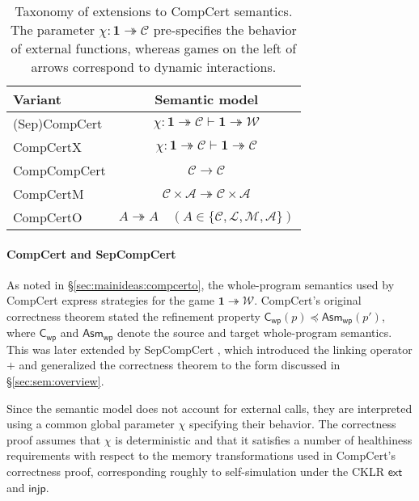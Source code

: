 \documentclass[acmsmall,authordraft]{acmart}
\newcommand{\kw}[1]{\ensuremath{ \mathsf{#1} }}
\newcommand{\refby}{\preceq}
\begin{document}
\begin{table} %
  \begin{tabular}{lc}
    \hline
    Variant & Semantic model \\
    \hline
    (Sep)CompCert \cite{compcert,sepcompcert} &
      $\chi : \mathbf{1} \twoheadrightarrow \mathcal{C}
       \vdash \mathbf{1} \twoheadrightarrow \mathcal{W}$ \\
    CompCertX \cite{popl15} &
      $\chi : \mathbf{1} \twoheadrightarrow \mathcal{C} \vdash
       \mathbf{1} \twoheadrightarrow \mathcal{C}$ \\
    CompCompCert \cite{compcompcert} &
      $\mathcal{C} \rightarrow \mathcal{C}$ \\
    CompCertM \cite{compcertm} &
      $\mathcal{C} \times \mathcal{A} \twoheadrightarrow
       \mathcal{C} \times \mathcal{A}$ \\
    CompCertO &
      $A \twoheadrightarrow A \quad
      (A \in \{\mathcal{C}, \mathcal{L}, \mathcal{M}, \mathcal{A}\})$ \\
    \hline
  \end{tabular}
  \caption{Taxonomy of extensions to CompCert semantics.
    The parameter $\chi : \mathbf{1} \twoheadrightarrow \mathcal{C}$
    pre-specifies the behavior of external functions,
    whereas games on the left of arrows
    correspond to dynamic interactions.
  }
  \label{tbl:compcerts}
\end{table}

\paragraph{CompCert and SepCompCert} %

As noted in \S\ref{sec:mainideas:compcerto},
the whole-program semantics used by CompCert
express strategies for the game
$\mathbf{1} \twoheadrightarrow \mathcal{W}$.
CompCert's original correctness theorem
stated the refinement property
$\kw{C}_\kw{wp}(p) \refby \kw{Asm}_\kw{wp}(p')$,
where $\kw{C}_\kw{wp}$ and $\kw{Asm}_\kw{wp}$
denote the source and target whole-program semantics.
This was later extended by SepCompCert \cite{sepcompcert},
which introduced the linking operator $+$
and generalized the correctness theorem to
the form discussed in \S\ref{sec:sem:overview}.

Since the semantic model does not account
for external calls,
they are interpreted %
using a common global parameter $\chi$
specifying their behavior.
The correctness proof assumes that $\chi$ is deterministic
and that it satisfies a number of healthiness requirements
with respect to the memory transformations
used in CompCert's correctness proof,
corresponding roughly to self-simulation
under the CKLR $\kw{ext}$ and $\kw{injp}$.
\end{document}
